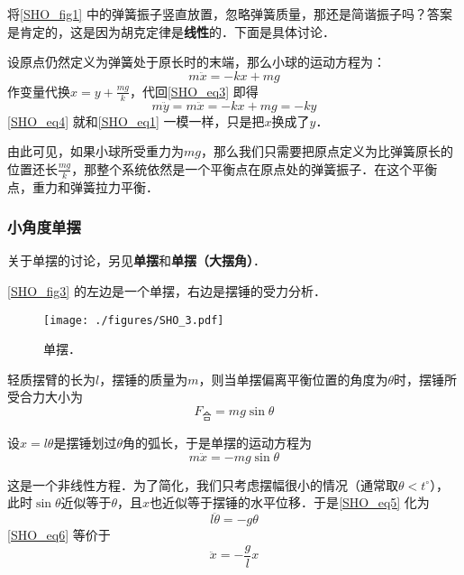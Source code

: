 将\autoref{SHO_fig1} 中的弹簧振子竖直放置，忽略弹簧质量，那还是简谐振子吗？答案是肯定的，这是因为胡克定律是\textbf{线性}的．下面是具体讨论．

设原点仍然定义为弹簧处于原长时的末端，那么小球的运动方程为：
\begin{equation}\label{SHO_eq3}
m\ddot{x} = -kx+mg
\end{equation}
作变量代换$x=y+\frac{mg}{k}$，代回\autoref{SHO_eq3} 即得
\begin{equation}\label{SHO_eq4}
m\ddot{y} = m\ddot{x} = -kx+mg = -ky
\end{equation}
\autoref{SHO_eq4} 就和\autoref{SHO_eq1} 一模一样，只是把$x$换成了$y$．

由此可见，如果小球所受重力为$mg$，那么我们只需要把原点定义为比弹簧原长的位置还长$\frac{mg}{k}$，那整个系统依然是一个平衡点在原点处的弹簧振子．在这个平衡点，重力和弹簧拉力平衡．


\subsubsection{小角度单摆}

关于单摆的讨论，另见\textbf{单摆}和\textbf{单摆（大摆角）}．

\autoref{SHO_fig3} 的左边是一个单摆，右边是摆锤的受力分析．

\begin{figure}[ht]
\centering
\texttt{[image: ./figures/SHO\_3.pdf]}
\caption{单摆．} \label{SHO_fig3}
\end{figure}

轻质摆臂的长为$l$，摆锤的质量为$m$，则当单摆偏离平衡位置的角度为$\theta$时，摆锤所受合力大小为
\begin{equation}
F_{\text{合}} = mg\sin\theta
\end{equation}

设$x=l\theta$是摆锤划过$\theta$角的弧长，于是单摆的运动方程为
\begin{equation}\label{SHO_eq5}
m\ddot{x} = -mg\sin\theta
\end{equation}

这是一个非线性方程．为了简化，我们只考虑摆幅很小的情况（通常取$\theta<t^\circ$），此时$\sin\theta$近似等于$\theta$，且$x$也近似等于摆锤的水平位移．于是\autoref{SHO_eq5} 化为
\begin{equation}\label{SHO_eq6}
l\ddot{\theta} = -g\theta
\end{equation}
\autoref{SHO_eq6} 等价于
\begin{equation}\label{SHO_eq7}
\ddot{x} = -\frac{g}{l}x
\end{equation}

